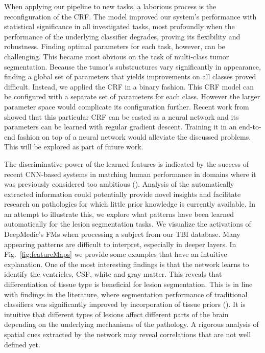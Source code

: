When applying our pipeline to new tasks, a laborious process is the reconfiguration of the CRF. The model improved our system's performance with statistical significance in all investigated tasks, most profoundly when the performance of the underlying classifier degrades, proving its flexibility and robustness. Finding optimal parameters for each task, however, can be challenging. This became most obvious on the task of multi-class tumor segmentation. Because the tumor's substructures vary significantly in appearance, finding a global set of parameters that yields improvements on all classes proved difficult. Instead, we applied the CRF in a binary fashion. This CRF model can be configured with a separate set of parameters for each class. However the larger parameter space would complicate its configuration further. Recent work from \cite{Zheng2015} showed that this particular CRF can be casted as a neural network and its parameters can be learned with regular gradient descent. Training it in an end-to-end fashion on top of a neural network would alleviate the discussed problems. This will be explored as part of future work.



The discriminative power of the learned features is indicated by the success of recent CNN-based systems in matching human performance in domains where it was previously considered too ambitious (\cite{he2015delving, Silver2016}). Analysis of the automatically extracted information could potentially provide novel insights and facilitate research on pathologies for which little prior knowledge is currently available. In an attempt to illustrate this, we explore what patterns have been learned automatically for the lesion segmentation tasks. We visualize the activations of DeepMedic's FMs when processing a subject from our TBI database. Many appearing patterns are difficult to interpret, especially in deeper layers. In Fig.~\ref{fig:featureMaps} we provide some examples that have an intuitive explanation. One of the most interesting findings is that the network learns to identify the ventricles, CSF, white and gray matter. This reveals that differentiation of tissue type is beneficial for lesion segmentation. This is in line with findings in the literature, where segmentation performance of traditional classifiers was significantly improved by incorporation of tissue priors (\cite{Leemput1999, Zikic2012}). It is intuitive that different types of lesions affect different parts of the brain depending on the underlying mechanisms of the pathology. A rigorous analysis of spatial cues extracted by the network may reveal correlations that are not well defined yet.

